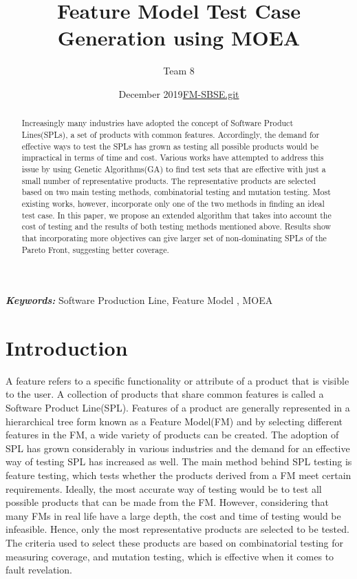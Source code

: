 \documentclass[a4paper,12pt]{article}
\title{ Feature Model Test Case Generation using MOEA}
\author{ Team 8 }
\date{December 2019}
\date{\href{https://github.com/youngmi97/FM-SBSE.git}{FM-SBSE.git}}
\begin{document}
\maketitle
\providecommand{\keywords}[1]{\textbf{\textit{Keywords:}} #1}
\begin{abstract}
Increasingly many industries have adopted the concept of Software Product Lines(SPLs), a set of products with common features. Accordingly, the demand for effective ways to test the SPLs has grown as testing all possible products would be impractical in terms of time and cost. Various works have attempted to address this issue by using Genetic Algorithms(GA) to find test sets that are effective with just a small number of representative products. The representative products are selected based on two main testing methods, combinatorial testing and mutation testing. Most existing works, however, incorporate only one of the two methods in finding an ideal test case. In this paper, we propose an extended algorithm that takes into account the cost of testing and the results of both testing methods mentioned above. Results show that incorporating more objectives can give larger set of non-dominating SPLs of the Pareto Front, suggesting better coverage. 


\end{abstract}

\keywords Software Production Line, Feature Model , MOEA 


\section{Introduction}

A feature refers to a specific functionality or attribute of a product that is visible to the user. A collection of products that share common features is called a Software Product Line(SPL). Features of a product are generally represented in a hierarchical tree form known as a Feature Model(FM) and by selecting different features in the FM, a wide variety of products can be created. The adoption of SPL has grown considerably in various industries and the demand for an effective way of testing SPL has increased as well. The main method behind SPL testing is feature testing, which tests whether the products derived from a FM meet certain requirements. Ideally, the most accurate way of testing would be to test all possible products that can be made from the FM. However, considering that many FMs in real life have a large depth, the cost and time of  testing would be infeasible. Hence, only the most representative products are selected to be tested. The criteria used to select these products are based on combinatorial testing for measuring coverage, and mutation testing, which is effective when it comes to fault revelation. 
\end{document}
